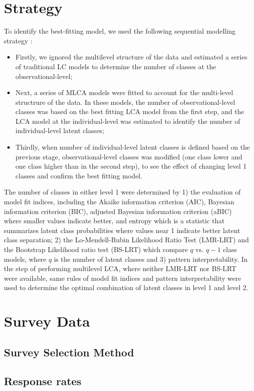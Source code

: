\section{Strategy}\vspace{-0.3cm}

To identify the best-fitting model, we used the following sequential modelling strategy \parencite{henry2010multilevel}: 

\begin{itemize}
	\item Firstly, we ignored the multilevel structure of the data and estimated a series of traditional LC models to determine the number of classes at the observational-level;
	\item Next, a series of MLCA models were fitted to account for the multi-level structrure of the data. In these models, the number of observational-level classes was based on the best fitting LCA model from the first step, and the LCA model at the individual-level was estimated to identify the number of individual-level latent classes;
	\item Thirdly, when number of individual-level latent classes is defined based on the previous stage, observational-level classes was modified (one class lower and one class higher than in the second step), to see the effect of changing level 1 classes and confirm the best fitting model.
\end{itemize}

The number of classes in either level 1 were determined by 1) the evaluation of model fit indices, including the Akaike information criterion (AIC), Bayesian information criterion (BIC), adjusted Bayesian information criterion (aBIC) where smaller values indicate better, and entropy which is a statistic that summarizes latent class probabilities where values near 1 indicate better latent class separation; 2) the Lo-Mendell-Rubin Likelihood Ratio Test (LMR-LRT) \parencite{lo2001testing, nylund2007deciding} and the Bootstrap Likelihood ratio test (BS-LRT) \parencite{peel2000robust} which compare $q$ vs. $q-1$ class models, where $q$ is the number of latent classes and 3) pattern interpretability. In the step of performing multilevel LCA, where neither LMR-LRT nor BS-LRT were available, same rules of model fit indices and pattern interpretability were used to determine the optimal combination of latent classes in level 1 and level 2. 




\section{Survey Data}

\subsection{Survey Selection Method}


\subsection{Response rates}
